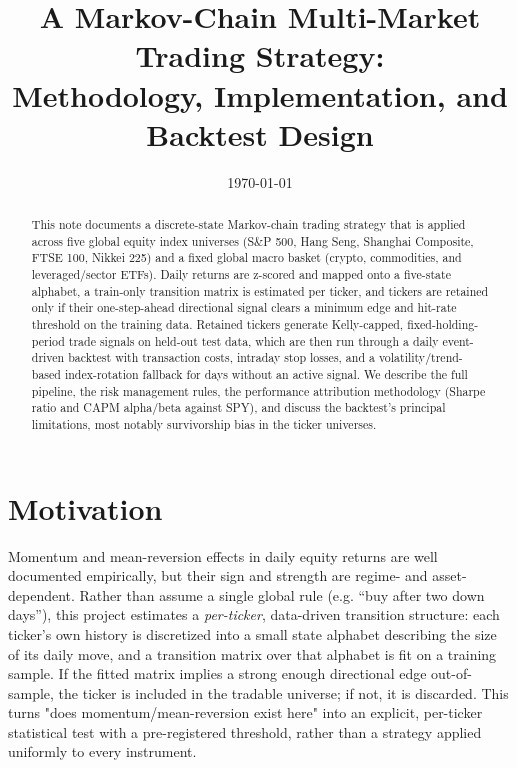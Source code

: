 \documentclass[11pt]{article}
\title{A Markov-Chain Multi-Market Trading Strategy: \\
Methodology, Implementation, and Backtest Design}
\author{}
\date{\today}
\begin{document}
\maketitle

\begin{abstract}
This note documents a discrete-state Markov-chain trading strategy that is
applied across five global equity index universes (S\&P 500, Hang Seng,
Shanghai Composite, FTSE 100, Nikkei 225) and a fixed global macro basket
(crypto, commodities, and leveraged/sector ETFs). Daily returns are
z-scored and mapped onto a five-state alphabet, a train-only transition
matrix is estimated per ticker, and tickers are retained only if their
one-step-ahead directional signal clears a minimum edge and hit-rate
threshold on the training data. Retained tickers generate Kelly-capped,
fixed-holding-period trade signals on held-out test data, which are then
run through a daily event-driven backtest with transaction costs, intraday
stop losses, and a volatility/trend-based index-rotation fallback for days
without an active signal. We describe the full pipeline, the risk
management rules, the performance attribution methodology (Sharpe ratio
and CAPM alpha/beta against SPY), and discuss the backtest's principal
limitations, most notably survivorship bias in the ticker universes.
\end{abstract}

\tableofcontents

\section{Motivation}

Momentum and mean-reversion effects in daily equity returns are well
documented empirically, but their sign and strength are regime- and
asset-dependent. Rather than assume a single global rule (e.g. ``buy after
two down days''), this project estimates a \emph{per-ticker}, data-driven
transition structure: each ticker's own history is discretized into a small
state alphabet describing the size of its daily move, and a transition
matrix over that alphabet is fit on a training sample. If the fitted matrix
implies a strong enough directional edge out-of-sample, the ticker is
included in the tradable universe; if not, it is discarded. This turns
"does momentum/mean-reversion exist here" into an explicit, per-ticker
statistical test with a pre-registered threshold, rather than a strategy
applied uniformly to every instrument.
\end{document}
